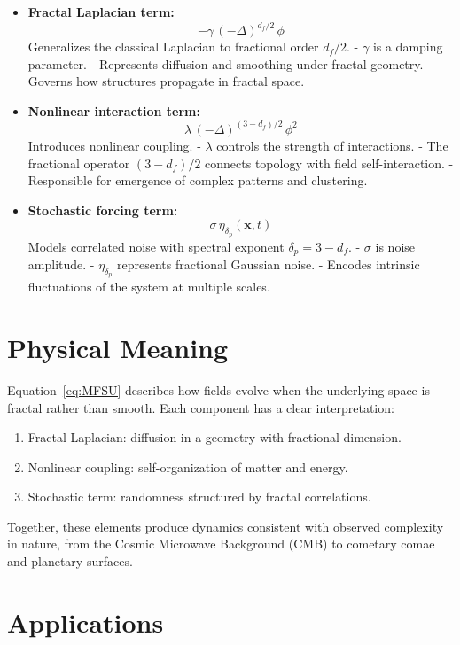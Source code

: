 \documentclass[11pt,a4paper]{article}
\begin{document}
\begin{itemize}
    \item \textbf{Fractal Laplacian term:}
    \[
    - \gamma \, (-\Delta)^{d_f/2}\,\phi
    \]
    Generalizes the classical Laplacian to fractional order $d_f/2$.  
    - $\gamma$ is a damping parameter.  
    - Represents diffusion and smoothing under fractal geometry.  
    - Governs how structures propagate in fractal space.

    \item \textbf{Nonlinear interaction term:}
    \[
    \lambda \, (-\Delta)^{(3-d_f)/2}\,\phi^2
    \]
    Introduces nonlinear coupling.  
    - $\lambda$ controls the strength of interactions.  
    - The fractional operator $(3-d_f)/2$ connects topology with field self-interaction.  
    - Responsible for emergence of complex patterns and clustering.

    \item \textbf{Stochastic forcing term:}
    \[
    \sigma \, \eta_{\delta_p}(\mathbf{x},t)
    \]
    Models correlated noise with spectral exponent $\delta_p = 3 - d_f$.  
    - $\sigma$ is noise amplitude.  
    - $\eta_{\delta_p}$ represents fractional Gaussian noise.  
    - Encodes intrinsic fluctuations of the system at multiple scales.
\end{itemize}

\section*{Physical Meaning}

Equation~\eqref{eq:MFSU} describes how fields evolve when the underlying space is fractal rather than smooth. Each component has a clear interpretation:
\begin{enumerate}
    \item Fractal Laplacian: diffusion in a geometry with fractional dimension.
    \item Nonlinear coupling: self-organization of matter and energy.
    \item Stochastic term: randomness structured by fractal correlations.
\end{enumerate}

Together, these elements produce dynamics consistent with observed complexity in nature, from the Cosmic Microwave Background (CMB) to cometary comae and planetary surfaces.

\section*{Applications}
\end{document}
